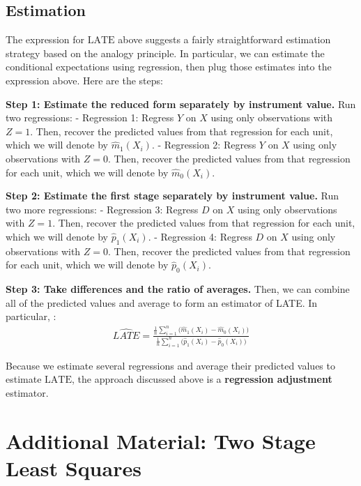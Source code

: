 \documentclass[
  letterpaper,
  DIV=11,
  numbers=noendperiod]{scrreprt}
\begin{document}
\subsection{Estimation}\label{estimation-2}

The expression for \(\text{LATE}\) above suggests a fairly
straightforward estimation strategy based on the analogy principle. In
particular, we can estimate the conditional expectations using
regression, then plug those estimates into the expression above. Here
are the steps:

\textbf{Step 1: Estimate the reduced form separately by instrument
value.} Run two regressions: - Regression 1: Regress \(Y\) on \(X\)
using only observations with \(Z=1\). Then, recover the predicted values
from that regression for each unit, which we will denote by
\(\hat{m}_1(X_i)\). - Regression 2: Regress \(Y\) on \(X\) using only
observations with \(Z=0\). Then, recover the predicted values from that
regression for each unit, which we will denote by \(\hat{m}_0(X_i)\).

\textbf{Step 2: Estimate the first stage separately by instrument
value.} Run two more regressions: - Regression 3: Regress \(D\) on \(X\)
using only observations with \(Z=1\). Then, recover the predicted values
from that regression for each unit, which we will denote by
\(\hat{p}_1(X_i)\). - Regression 4: Regress \(D\) on \(X\) using only
observations with \(Z=0\). Then, recover the predicted values from that
regression for each unit, which we will denote by \(\hat{p}_0(X_i)\).

\textbf{Step 3: Take differences and the ratio of averages.} Then, we
can combine all of the predicted values and average to form an estimator
of LATE. In particular, : \begin{align*}
  \widehat{LATE} = \frac{\displaystyle \frac{1}{n}\sum_{i=1}^n \big(\hat{m}_1(X_i) - \hat{m}_0(X_i)\big)}{\displaystyle \frac{1}{n}\sum_{i=1}^n \big(\hat{p}_1(X_i) - \hat{p}_0(X_i)\big)}
\end{align*}

Because we estimate several regressions and average their predicted
values to estimate \(\text{LATE}\), the approach discussed above is a
\textbf{regression adjustment} estimator.

\section{Additional Material: Two Stage Least
Squares}\label{additional-material-two-stage-least-squares}
\end{document}
